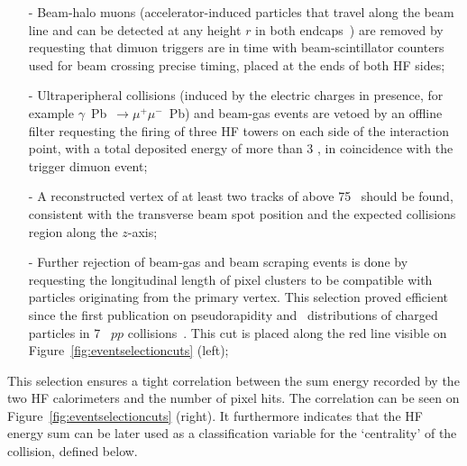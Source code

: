 \begin{itemize}

\item[-] Beam-halo muons (accelerator-induced particles that travel
  along the beam line and can be detected at any height $r$ in both
  endcaps~\cite{beamhalo}) are removed by requesting that dimuon triggers are in time with
  beam-scintillator counters used for beam crossing precise timing,
  placed at the ends of both HF sides;
\item[-] Ultraperipheral collisions (induced by the electric
  charges in presence, for example $\gamma$~Pb~$\to \mu^{+}\mu^{-}$~Pb) and
  beam-gas events are vetoed by an offline filter requesting the
  firing of three HF towers on each side of the
  interaction point, with a total deposited energy of more than 3
  \GeV, in coincidence with the trigger dimuon event;
\item[-] A reconstructed vertex of at least two tracks of \pt above 75
  \MeVc\ should be found, consistent with the transverse beam spot
  position and the expected collisions region along the $z$-axis;
\item[-] Further rejection of beam-gas and beam scraping events is
  done by requesting the longitudinal length of pixel clusters
  to be compatible with particles originating from the primary
  vertex. This selection proved efficient since the first publication
  on pseudorapidity and \pt\ distributions of charged particles in 7
  \TeV\ $pp$ collisions~\cite{ppmult}. This cut is placed along the red
  line visible on Figure~\ref{fig:eventselectioncuts} (left);

\end{itemize}

This selection ensures a tight correlation between the sum energy
recorded by the two HF calorimeters and the number of pixel hits. The
correlation can be seen on Figure~\ref{fig:eventselectioncuts}
(right). It furthermore indicates that the HF energy sum can be later
used as a classification variable for the `centrality' of the
collision, defined below.


